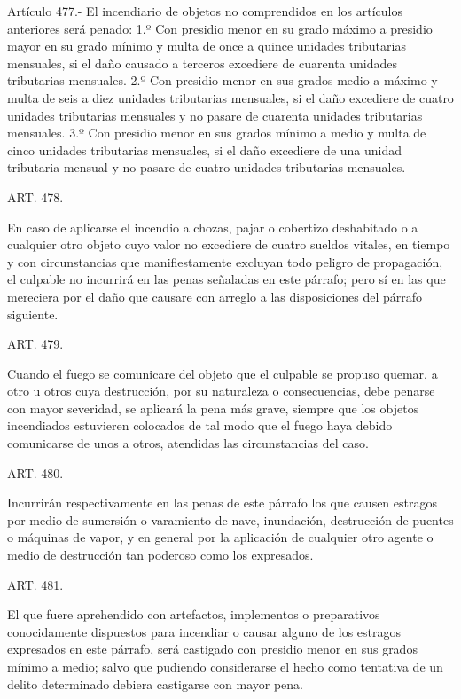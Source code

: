     Artículo 477.- El incendiario de objetos no comprendidos en los artículos anteriores será penado:
    1.º Con presidio menor en su grado máximo a presidio mayor en su grado mínimo y multa de once a quince unidades tributarias mensuales, si el daño causado a terceros excediere de cuarenta unidades tributarias mensuales.
    2.º Con presidio menor en sus grados medio a máximo y multa de seis a diez unidades tributarias mensuales, si el daño excediere de cuatro unidades tributarias mensuales y no pasare de cuarenta unidades tributarias mensuales.
    3.º Con presidio menor en sus grados mínimo a medio y multa de cinco unidades tributarias mensuales, si el daño excediere de una unidad tributaria mensual y no pasare de cuatro unidades tributarias mensuales.


    ART. 478.

    En caso de aplicarse el incendio a chozas, pajar o cobertizo deshabitado o a cualquier otro objeto cuyo valor no excediere de cuatro sueldos vitales, en tiempo y con circunstancias que manifiestamente excluyan todo peligro de propagación, el culpable no incurrirá en las penas señaladas en este párrafo; pero sí en las que mereciera por el daño que causare con arreglo a las disposiciones del párrafo siguiente.


    ART. 479.

    Cuando el fuego se comunicare del objeto que el culpable se propuso quemar, a otro u otros cuya destrucción, por su naturaleza o consecuencias, debe penarse con mayor severidad, se aplicará la pena más grave, siempre que los objetos incendiados estuvieren colocados de tal modo que el fuego haya debido comunicarse de unos a otros, atendidas las circunstancias del caso.


    ART. 480.

    Incurrirán respectivamente en las penas de este párrafo los que causen estragos por medio de sumersión o varamiento de nave, inundación, destrucción de puentes o máquinas de vapor, y en general por la aplicación de cualquier otro agente o medio de destrucción tan poderoso como los expresados.



    ART. 481.

    El que fuere aprehendido con artefactos, implementos o preparativos conocidamente dispuestos para incendiar o causar alguno de los estragos expresados en este párrafo, será castigado con presidio menor en sus grados mínimo a medio; salvo que pudiendo considerarse el hecho como tentativa de un delito determinado debiera castigarse con mayor pena.



